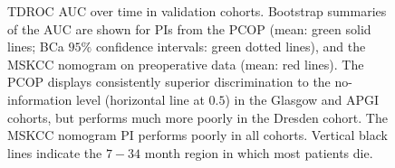 \documentclass[dissertation.tex]{subfiles}
\begin{document}
\begin{figure}
\centering
\caption[\acrshort{TDROC} \acrshort{AUC} paths for \acrshort{PCOP} in validation data]{\gls{TDROC} \gls{AUC} over time in validation cohorts.  Bootstrap summaries of the \gls{AUC} are shown for \glspl{PI} from the \gls{PCOP} (mean: green solid lines; BCa $95\%$ confidence intervals: green dotted lines), and the \gls{MSKCC} nomogram on preoperative data (mean: red lines).  The \gls{PCOP} displays consistently superior discrimination to the no-information level (horizontal line at $0.5$) in the Glasgow and \gls{APGI} cohorts, but performs much more poorly in the Dresden cohort.  The \gls{MSKCC} nomogram \gls{PI} performs poorly in all cohorts.  Vertical black lines indicate the $7-34$ month region in which most patients die.}
\label{fig:nomo-val-tdroc}
\end{figure}
\end{document}
